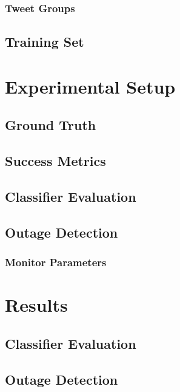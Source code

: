 \documentclass[12pt]{ucthesis}
\begin{document}
\subsection{Tweet Groups}
\label{class-tweet-groups}

\section{Training Set}
\label{class-training-set}

\chapter{Experimental Setup}
\label{experiments}

\section{Ground Truth}
\label{exp-truth}

\section{Success Metrics}
\label{exp-metrics}

\section{Classifier Evaluation}
\label{exp-classifier}

\section{Outage Detection}
\label{exp-outage}

\subsection{Monitor Parameters}
\label{exp-monitor-params}

\chapter{Results}
\label{results}

\section{Classifier Evaluation}
\label{res-classifier}

\section{Outage Detection}
\label{res-outage}
\end{document}
